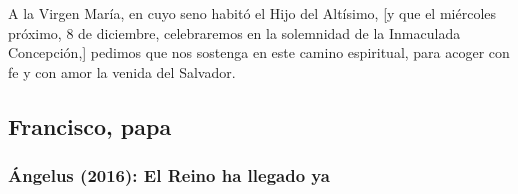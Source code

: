 \begin{body}
	A la Virgen María, en cuyo seno habitó el Hijo del Altísimo, {[}y que el miércoles próximo, 8 de diciembre, celebraremos en la solemnidad de la Inmaculada Concepción,{]} pedimos que nos sostenga en este camino espiritual, para acoger con fe y con amor la venida del Salvador.
\end{body}

\newsection

\subsection{Francisco, papa}

\subsubsection{Ángelus (2016): El Reino ha llegado ya}


